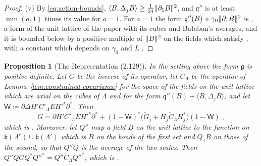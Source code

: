 \documentclass[11pt]{preprint}
\DeclarePairedDelimiter{\norm}{\lVert}{\rVert}
\numberwithin{equation}{section}
\newtheorem{proposition}[theorem]{Proposition}
\theoremstyle{definition}
\theoremstyle{remark}
\theoremstyle{plain}
\begin{document}
\begin{proof}
(v) By \eqref{eq:action-bounds}, $\langle B, \Delta_jB\rangle \geq \frac{1}{24}\norm{\partial_1B}^2$, and $\mathfrak q''$ is at least $\min(a, 1)$ times its value for $a = 1$. For $a = 1$ the form $\mathfrak q''(B) + \gamma_0\norm{\partial_1B}^2$ is \cite[(2.122)]{BalabanPRT2}, a form of the unit lattice of the paper with its cubes and Ba{\l}aban's averages, and it is bounded below by a positive multiple of $\norm B^2$ on the fields which satisfy \cite[(2.121)]{BalabanPRT2}, with a constant which depends on $\gamma_0$ and $L$ \cite[p.~246]{BalabanPRT2}.
\end{proof}

\begin{proposition}[The Representation (2.129)]\label{prop:two-scale-propagator}
In the setting above the form $\mathfrak g$ is positive definite. Let $G$ be the inverse of its operator, let $\tilde C_\Lambda$ be the operator of Lemma~\ref{lem:constrained-covariance} for the space of the fields on the unit lattice which are axial on the cubes of $\Lambda$ and for the form $\mathfrak q''(B) + \langle B, \Delta_jB\rangle$, and let $\mathsf W \coloneqq \partial\Delta H'C'_\Lambda EH'^*\partial^*$. Then
\begin{equation}\label{eq:two-scale-representation}
    G = \partial H'C'_\Lambda EH'^*\partial^* + (1 - \mathsf W)^*\bigl(\tilde G_j + H_j\tilde C_\Lambda H_j^*\bigr)(1 - \mathsf W)\;,
\end{equation}
which is \cite[(2.129)]{BalabanPRT2}. Moreover, let $Q''$ map a field $B$ on the unit lattice to the function on $\mathfrak b(\Lambda^c) \cup \mathfrak b(\Lambda')$ which is $B$ on the bonds of the first set and $Q_1B$ on those of the second, so that $Q''Q$ is the average of the two scales. Then $Q''QGQ^*Q''^* = Q''\tilde C_\Lambda Q''^*$, which is \cite[(2.146)]{BalabanPRT2}.
\end{proposition}
\end{document}

